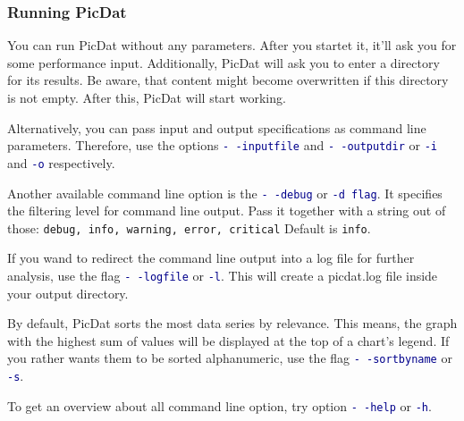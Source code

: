 \documentclass[8pt]{beamer}
\begin{document}
\begin{frame}
\frametitle{Running PicDat}
You can run PicDat without any parameters. After you startet it, it'll ask you for some performance input. Additionally, PicDat will ask you to enter a directory for its results. Be aware, that content might become overwritten if this directory is not empty. After this, PicDat will start working. 
\bigskip

Alternatively, you can pass input and output specifications as command line parameters. Therefore, use the options \textcolor{darkblue}{\texttt{-\,-inputfile}} and \textcolor{darkblue}{\texttt{-\,-outputdir}} or \textcolor{darkblue}{\texttt{-i}} and \textcolor{darkblue}{\texttt{-o}} respectively.
\smallskip

Another available command line option is the \textcolor{darkblue}{\texttt{-\,-debug}} or \textcolor{darkblue}{\texttt{-d flag}}. It specifies the filtering level for command line output. Pass it together with a string out of those: \texttt{debug, info, warning, error, critical}
Default is \texttt{info}.
\smallskip

If you wand to redirect the command line output into a log file for further analysis, use the flag \textcolor{darkblue}{\texttt{-\,-logfile}} or \textcolor{darkblue}{\texttt{-l}}. This will create a picdat.log file inside your output directory.
\smallskip

By default, PicDat sorts the most data series by relevance. This means, the graph with the highest sum of values will be displayed at the top of a chart's legend. If you rather wants them to be sorted alphanumeric, use the flag \textcolor{darkblue}{\texttt{-\,-sortbyname}} or \textcolor{darkblue}{\texttt{-s}}.
\bigskip

To get an overview about all command line option, try option \textcolor{darkblue}{\texttt{-\,-help}} or  \textcolor{darkblue}{\texttt{-h}}.
\end{frame}
\end{document}
